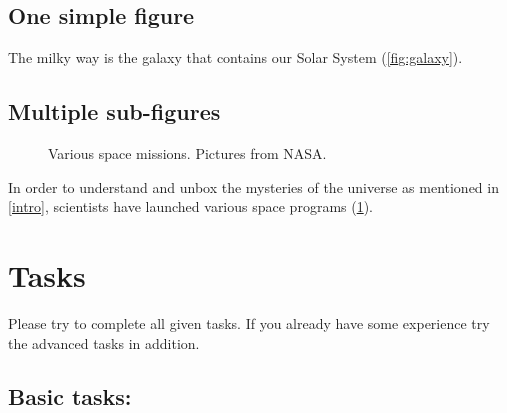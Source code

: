 \documentclass{article}
\numberwithin{equation}{section}
\begin{document}
\subsection{One simple figure}
The milky way is the galaxy that contains our Solar System (\cref{fig:galaxy}).

\subsection{Multiple sub-figures}


\begin{figure}[t]%
    \centering
    \qquad
    \caption{Various space missions. Pictures from NASA.}%
    \label{fig:space}%
\end{figure}



In order to understand and unbox the mysteries of the universe as mentioned in \cref{intro}, scientists have launched various space programs (\cref{fig:space}).

\section{Tasks}

Please try to complete all given tasks. If you already have some experience try the advanced tasks in addition.

\subsection{Basic tasks:}
\end{document}
